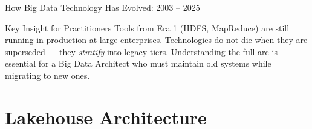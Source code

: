 \documentclass[aspectratio=169,10pt]{beamer}
\begin{document}
\begin{frame}{How Big Data Technology Has Evolved: 2003 -- 2025}
\begin{center}
  \end{center}
  \vspace{4pt}
  \begin{alertblock}{\small Key Insight for Practitioners}
    \small Tools from Era 1 (HDFS, MapReduce) are still running in production at large enterprises.  Technologies do not die when they are superseded --- they \textit{stratify} into legacy tiers.  Understanding the full arc is essential for a Big Data Architect who must maintain old systems while migrating to new ones.
  \end{alertblock}
\end{frame}

\section{Lakehouse Architecture}
\end{document}
